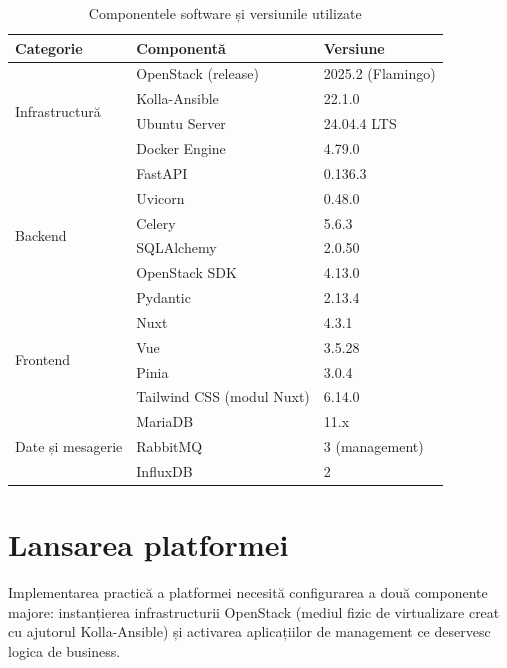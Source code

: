 \begin{table}[H]
    \centering
    \caption{Componentele software și versiunile utilizate}
    \label{tab:cap4_software}
    \begin{tabular}{l l l}
        \hline
        \textbf{Categorie} & \textbf{Componentă} & \textbf{Versiune} \\
        \hline
        \multirow{4}{*}{Infrastructură} & OpenStack (release) & 2025.2 (Flamingo) \\
                                        & Kolla-Ansible & 22.1.0 \\
                                        & Ubuntu Server & 24.04.4 LTS \\
                                        & Docker Engine & 4.79.0 \\
        \hline
        \multirow{6}{*}{Backend} & FastAPI & 0.136.3 \\
                                 & Uvicorn & 0.48.0 \\
                                 & Celery & 5.6.3 \\
                                 & SQLAlchemy & 2.0.50 \\
                                 & OpenStack SDK & 4.13.0 \\
                                 & Pydantic & 2.13.4 \\
        \hline
        \multirow{4}{*}{Frontend} & Nuxt & 4.3.1 \\
                                  & Vue & 3.5.28 \\
                                  & Pinia & 3.0.4 \\
                                  & Tailwind CSS (modul Nuxt) & 6.14.0 \\
        \hline
        \multirow{3}{*}{Date și mesagerie} & MariaDB & 11.x \\
                                           & RabbitMQ & 3 (management) \\
                                           & InfluxDB & 2 \\
        \hline
    \end{tabular}
\end{table}

\section{Lansarea platformei}
\label{sec:cap4_punere}

Implementarea practică a platformei necesită configurarea a două componente majore: instanțierea infrastructurii OpenStack (mediul fizic de virtualizare creat cu ajutorul Kolla-Ansible) și activarea aplicațiilor de management ce deservesc logica de business.

